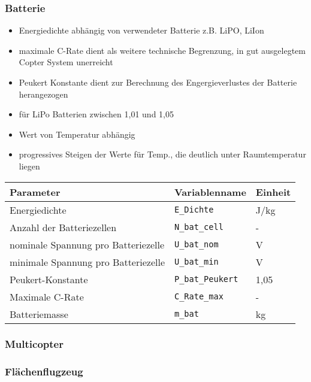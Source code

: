 \subsubsection{Batterie}
\begin{itemize}
	\item Energiedichte abhängig von verwendeter Batterie z.B. LiPO, LiIon
	\item maximale C-Rate dient als weitere technische Begrenzung, in gut ausgelegtem Copter System unerreicht
	\item Peukert Konstante dient zur Berechnung des Engergieverlustes der Batterie herangezogen
	\item für LiPo Batterien zwischen 1,01 und 1,05
	\item Wert von Temperatur abhängig
	\item progressives Steigen der Werte für Temp., die deutlich unter Raumtemperatur liegen
\end{itemize}




\begin{center}
	\begin{tabular}{l l l} \hline
		 Parameter & Variablenname & Einheit \\ \hline
		 Energiedichte & \texttt{E\_Dichte} & J/kg \\
		 Anzahl der Batteriezellen & \texttt{N\_bat\_cell} & - \\
		 nominale Spannung pro Batteriezelle & \texttt{U\_bat\_nom} & V \\
		 minimale Spannung pro Batteriezelle & \texttt{U\_bat\_min} & V \\
		 Peukert-Konstante & \texttt{P\_bat\_Peukert} & 1,05 \\
		 Maximale C-Rate & \texttt{C\_Rate\_max} & - \\
		 Batteriemasse & \texttt{m\_bat} & kg \\ \hline
	\end{tabular}	
	\label{tab:bat_parameter}
\end{center}

\subsubsection{Multicopter}

\subsubsection{Flächenflugzeug}

